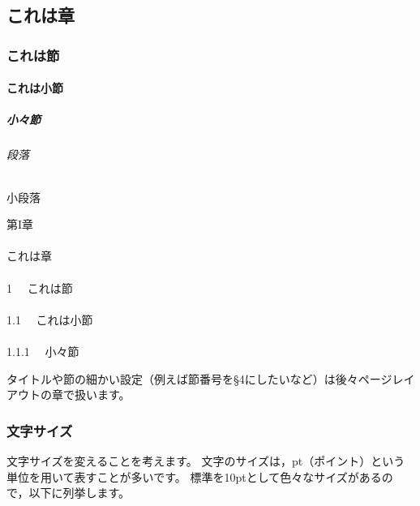 \begin{IOtcb}
\begin{verbatim*}
\part{これは章}
\section{これは節}
\subsection{これは小節}
\subsubsection{小々節}
\paragraph{段落}
\subparagraph{小段落}
\end{verbatim*}
\tcblower
\vspace{5pt}

{\gtfamily \noindent
{\Large{第I章}} \\
\vspace{-5pt} \\ \noindent
{\huge{これは章}} \\
\vspace{-2pt} \\ \noindent
{\Large{1 \ \ これは節}} \\
\vspace{-6pt} \\ \noindent
{\large{1.1 \ \ これは小節}} \\
\vspace{-6pt} \\ \noindent
{1.1.1 \ \ 小々節}
}
\vspace*{5pt}
\end{IOtcb}

タイトルや節の細かい設定（例えば節番号を{\S}4にしたいなど）は後々ページレイアウトの章で扱います。



\section{文字サイズ}
\label{sec:char-size}

文字サイズを変えることを考えます。
文字のサイズは，pt（ポイント）という単位を用いて表すことが多いです。
標準を10ptとして色々なサイズがあるので，以下に列挙します。

